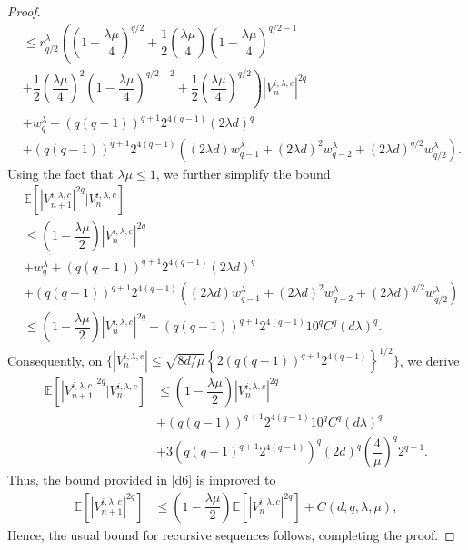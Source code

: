 \documentclass[a4paper, 10pt]{article}
\theoremstyle{plain}%
\begin{document}
\begin{proof}
\begin{align*}
&\leq r^{\lambda}_{q/2}\left(\left(1-\dfrac{\lambda\mu}{4}\right)^{q/2}+\dfrac{1}{2}\left(\dfrac{\lambda\mu}{4}\right)\left(1-\dfrac{\lambda\mu}{4}\right)^{q/2-1}\right.\\
&\left.+\dfrac{1}{2}\left(\dfrac{\lambda\mu}{4}\right)^{2}\left(1-\dfrac{\lambda\mu}{4}\right)^{q/2-2}+\dfrac{1}{2}\left(\dfrac{\lambda\mu}{4}\right)^{q/2}\right)|V_n^{i,\lambda,c}|^{2q}\\
&+w_q^{\lambda}+(q(q-1))^{q+1}2^{4(q-1)}(2\lambda d)^q\\
&+(q(q-1))^{q+1}2^{4(q-1)}\left((2\lambda d)w_{q-1}^{\lambda}+(2\lambda d)^2w_{q-2}^{\lambda}+(2\lambda d)^{q/2}w_{q/2}^{\lambda}\right).
\end{align*}
Using the fact that $\lambda\mu\leq 1$, we further simplify the bound
\begin{align*}
&\mathbb{E}\left[|V^{i,\lambda,c}_{n+1}|^{2q}|V^{i,\lambda,c}_{n}\right]\\&\leq \left(1-\dfrac{\lambda\mu}{2}\right)|V^{i,\lambda,c}_{n}|^{2q}\\
&+w_q^{\lambda}+(q(q-1))^{q+1}2^{4(q-1)}(2\lambda d)^q\\
&+(q(q-1))^{q+1}2^{4(q-1)}\left((2\lambda d)w_{q-1}^{\lambda}+(2\lambda d)^2w_{q-2}^{\lambda}+(2\lambda d)^{q/2}w_{q/2}^{\lambda}\right)\\
&\leq   \left(1-\dfrac{\lambda\mu}{2}\right)|V^{i,\lambda,c}_{n}|^{2q}+(q(q-1))^{q+1}2^{4(q-1)}10^qC^q(d\lambda)^q.
\end{align*}
Consequently, on $\{|V^{i,\lambda,c}_{n}|\leq \sqrt{8d/\mu}\left\{2(q(q-1))^{q+1}2^{4(q-1)}\right\}^{1/2}\}$, we derive
\begin{align*}
\mathbb{E}\left[|V^{i,\lambda,c}_{n+1}|^{2q}|V^{i,\lambda,c}_{n}\right]&\leq  \left(1-\dfrac{\lambda\mu}{2}\right)|V^{i,\lambda,c}_{n}|^{2q}\\&+(q(q-1))^{q+1}2^{4(q-1)}10^qC^q(d\lambda)^q\\&+3\left(q(q-1)^{q+1}2^{4(q-1)}\right)^q(2d)^q\left(\dfrac{4}{\mu}\right)^q2^{q-1}.
\end{align*}
Thus, the bound provided in \eqref{d6} is improved to
\begin{align*}
\mathbb{E}\left[|V^{i,\lambda,c}_{n+1}|^{2q}\right]&\leq  \left(1-\dfrac{\lambda\mu}{2}\right)\mathbb{E}\left[|V^{i,\lambda,c}_{n}|^{2q}\right]+C(d,q,\lambda,\mu),
\end{align*}
Hence, the usual bound for recursive sequences follows, completing the proof.
\end{proof}
\end{document}
